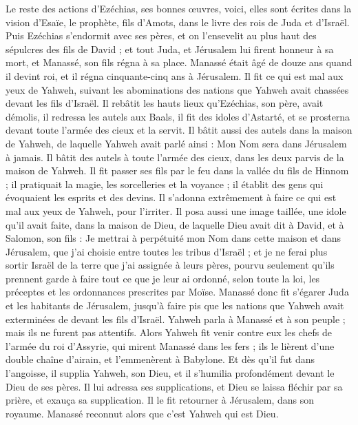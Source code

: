 \begin{multicols}{2}
Le reste des actions d'Ezéchias, ses bonnes œuvres, voici, elles sont écrites dans la vision d'Esaïe, le prophète, fils d'Amots, dans le livre des rois de Juda et d'Israël.
Puis Ezéchias s'endormit avec ses pères, et on l'ensevelit au plus haut des sépulcres des fils de David ; et tout Juda, et Jérusalem lui firent honneur à sa mort, et Manassé, son fils régna à sa place.
\VerseOne{}Manassé était âgé de douze ans quand il devint roi, et il régna cinquante-cinq ans à Jérusalem.
Il fit ce qui est mal aux yeux de Yahweh, suivant les abominations des nations que Yahweh avait chassées devant les fils d’Israël.
Il rebâtit les hauts lieux qu'Ezéchias, son père, avait démolis, il redressa les autels aux Baals, il fit des idoles d'Astarté, et se prosterna devant toute l'armée des cieux et la servit.
Il bâtit aussi des autels dans la maison de Yahweh, de laquelle Yahweh avait parlé ainsi : Mon Nom sera dans Jérusalem à jamais.
Il bâtit des autels à toute l'armée des cieux, dans les deux parvis de la maison de Yahweh.
Il fit passer ses fils par le feu dans la vallée du fils de Hinnom ; il pratiquait la magie, les sorcelleries et la voyance ; il établit des gens qui évoquaient les esprits et des devins. Il s'adonna extrêmement à faire ce qui est mal aux yeux de Yahweh, pour l'irriter.
Il posa aussi une image taillée, une idole qu'il avait faite, dans la maison de Dieu, de laquelle Dieu avait dit à David, et à Salomon, son fils : Je mettrai à perpétuité mon Nom dans cette maison et dans Jérusalem, que j'ai choisie entre toutes les tribus d'Israël ;
et je ne ferai plus sortir Israël de la terre que j'ai assignée à leurs pères, pourvu seulement qu'ils prennent garde à faire tout ce que je leur ai ordonné, selon toute la loi, les préceptes et les ordonnances prescrites par Moïse.
Manassé donc fit s’égarer Juda et les habitants de Jérusalem, jusqu'à faire pis que les nations que Yahweh avait exterminées de devant les fils d’Israël.
Yahweh parla à Manassé et à son peuple ; mais ils ne furent pas attentifs.
Alors Yahweh fit venir contre eux les chefs de l'armée du roi d’Assyrie, qui mirent Manassé dans les fers ; ils le lièrent d'une double chaîne d'airain, et l'emmenèrent à Babylone.
Et dès qu'il fut dans l’angoisse, il supplia Yahweh, son Dieu, et il s'humilia profondément devant le Dieu de ses pères.
Il lui adressa ses supplications, et Dieu se laissa fléchir par sa prière, et exauça sa supplication. Il le fit retourner à Jérusalem, dans son royaume. Manassé reconnut alors que c'est Yahweh qui est Dieu.

\end{multicols}
